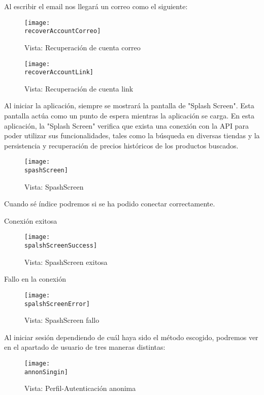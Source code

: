 \documentclass[12pt,twoside,titlepage]{report}
\newcommand{\recoverAccountCorreo}{images/correo_recuperacion.png}
\newcommand{\recoverAccountLink}{images/correo_recuperacion_2.png}
\newcommand{\spashScreen}{images/splash_screen.png}
\newcommand{\spalshScreenError}{images/spash_screen_error.png}
\newcommand{\spalshScreenSuccess}{images/splash_screen_success.png}
\newcommand{\annonSingin}{images/annon_login.png}
\begin{document}
Al escribir el email nos llegará un correo como el siguiente:

\begin{figure}[H]
    \centering
	\texttt{[image: \\recoverAccountCorreo]}
    \caption{Vista: Recuperación de cuenta correo}
    \label{fig:Log-In}
\end{figure}

\begin{figure}[H]
    \centering
	\texttt{[image: \\recoverAccountLink]}
    \caption{Vista: Recuperación de cuenta link}
    \label{fig:Log-In}
\end{figure}

Al iniciar la aplicación, siempre se mostrará la pantalla de "Splash Screen". Esta pantalla actúa como un punto de espera mientras la aplicación se carga. En esta aplicación, la "Splash Screen" verifica que exista una conexión con la API para poder utilizar sus funcionalidades, tales como la búsqueda en diversas tiendas y la persistencia y recuperación de precios históricos de los productos buscados.

\begin{figure}[H]
    \centering
	\texttt{[image: \\spashScreen]}
    \caption{Vista: SpashScreen}
    \label{fig:Log-In}
\end{figure}

Cuando sé índice podremos si se ha podido conectar correctamente. 

Conexión exitosa

\begin{figure}[H]
    \centering
	\texttt{[image: \\spalshScreenSuccess]}
    \caption{Vista: SpashScreen exitosa}
    \label{fig:Log-In}
\end{figure}

Fallo en la conexión

\begin{figure}[H]
    \centering
	\texttt{[image: \\spalshScreenError]}
    \caption{Vista: SpashScreen fallo}
    \label{fig:Log-In}
\end{figure}

Al iniciar sesión dependiendo de cuál haya sido el método escogido, podremos ver en el apartado de usuario de tres maneras distintas:

\begin{figure}[H]
    \centering
	\texttt{[image: \\annonSingin]}
    \caption{Vista: Perfil-Autenticación anonima}
    \label{fig:Annon_Singin}
\end{figure}
\end{document}
